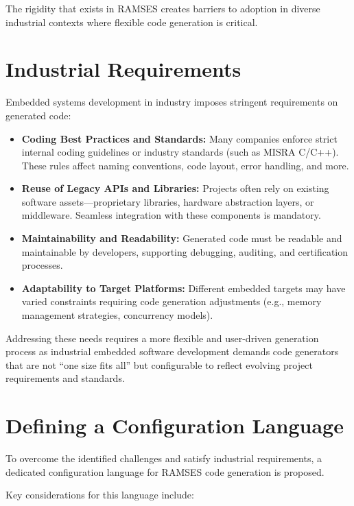 The rigidity that exists in RAMSES creates barriers to adoption in diverse industrial contexts where flexible code generation is critical.

\section{Industrial Requirements}
\label{sec:industrial_requirements}

Embedded systems development in industry imposes stringent requirements on generated code:

\begin{itemize}
	\item \textbf{Coding Best Practices and Standards:} Many companies enforce strict internal coding guidelines or industry standards (such as MISRA C/C++). These rules affect naming conventions, code layout, error handling, and more.
	\item \textbf{Reuse of Legacy APIs and Libraries:} Projects often rely on existing software assets—proprietary libraries, hardware abstraction layers, or middleware. Seamless integration with these components is mandatory.
	\item \textbf{Maintainability and Readability:} Generated code must be readable and maintainable by developers, supporting debugging, auditing, and certification processes.
	\item \textbf{Adaptability to Target Platforms:} Different embedded targets may have varied constraints requiring code generation adjustments (e.g., memory management strategies, concurrency models).
\end{itemize}

Addressing these needs requires a more flexible and user-driven generation process as industrial embedded software development demands code generators that are not “one size fits all” but configurable to reflect evolving project requirements and standards.



\section{Defining a Configuration Language}
\label{sec:config_language_definition}

To overcome the identified challenges and satisfy industrial requirements, a dedicated configuration language for RAMSES code generation is proposed.

Key considerations for this language include:


